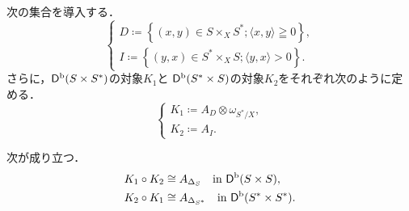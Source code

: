 次の集合を導入する．
\begin{equation}
    \begin{cases}
        D\coloneqq\left\{
            (x,y)\in S\times_{X}S^\ast;
            \langle x,y\rangle\geqq0
        \right\},\\
        I\coloneqq\left\{
            (y,x)\in S^\ast\times_{X}S;
            \langle y,x\rangle>0
        \right\}.
    \end{cases}\tag{3.6.4}\label{eq364}
\end{equation}
さらに，\(\mathop{\mathsf{D}^\mathrm{b}}\nolimits(S\times S^\ast)\)の対象\(K_1\)と
\(\mathop{\mathsf{D}^\mathrm{b}}\nolimits(S^\ast\times S)\)の対象\(K_2\)をそれぞれ次のように定める．
\begin{equation}
    \begin{cases}
        K_1\coloneqq A_D\otimes\omega_{S^\ast/X},\\
        K_2\coloneqq A_I.
    \end{cases}\tag{3.6.5}\label{eq365}
\end{equation}

\begin{leftbar}
    \begin{PRP}[{\cite[Proposition 3.6.7]{KS90}}]\label{367}
        次が成り立つ．
        \begin{align*}
            K_1\circ K_2&\cong A_{\Delta_S}\quad\text{in \(\mathop{\mathsf{D}^\mathrm{b}}\nolimits(S\times S)\)},\\
            K_2\circ K_1&\cong A_{\Delta_{S^\ast}}\quad\text{in \(\mathop{\mathsf{D}^\mathrm{b}}\nolimits(S^\ast\times S^\ast)\)}.
        \end{align*}
    \end{PRP}        
\end{leftbar}










